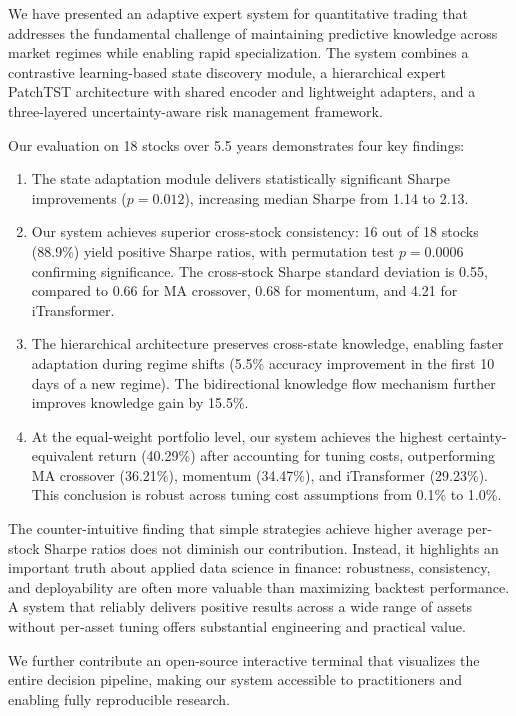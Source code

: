 \documentclass[review]{elsarticle}
\begin{document}
We have presented an adaptive expert system for quantitative trading that addresses the fundamental challenge of maintaining predictive knowledge across market regimes while enabling rapid specialization. The system combines a contrastive learning-based state discovery module, a hierarchical expert PatchTST architecture with shared encoder and lightweight adapters, and a three-layered uncertainty-aware risk management framework.

Our evaluation on 18 stocks over 5.5 years demonstrates four key findings:

\begin{enumerate}
\item The state adaptation module delivers statistically significant Sharpe improvements ($p=0.012$), increasing median Sharpe from 1.14 to 2.13.

\item Our system achieves superior cross-stock consistency: 16 out of 18 stocks (88.9\%) yield positive Sharpe ratios, with permutation test $p=0.0006$ confirming significance. The cross-stock Sharpe standard deviation is 0.55, compared to 0.66 for MA crossover, 0.68 for momentum, and 4.21 for iTransformer.

\item The hierarchical architecture preserves cross-state knowledge, enabling faster adaptation during regime shifts (5.5\% accuracy improvement in the first 10 days of a new regime). The bidirectional knowledge flow mechanism further improves knowledge gain by 15.5\%.

\item At the equal-weight portfolio level, our system achieves the highest certainty-equivalent return (40.29\%) after accounting for tuning costs, outperforming MA crossover (36.21\%), momentum (34.47\%), and iTransformer (29.23\%). This conclusion is robust across tuning cost assumptions from 0.1\% to 1.0\%.
\end{enumerate}

The counter-intuitive finding that simple strategies achieve higher average per-stock Sharpe ratios does not diminish our contribution. Instead, it highlights an important truth about applied data science in finance: robustness, consistency, and deployability are often more valuable than maximizing backtest performance. A system that reliably delivers positive results across a wide range of assets without per-asset tuning offers substantial engineering and practical value.

We further contribute an open-source interactive terminal that visualizes the entire decision pipeline, making our system accessible to practitioners and enabling fully reproducible research.
\end{document}
